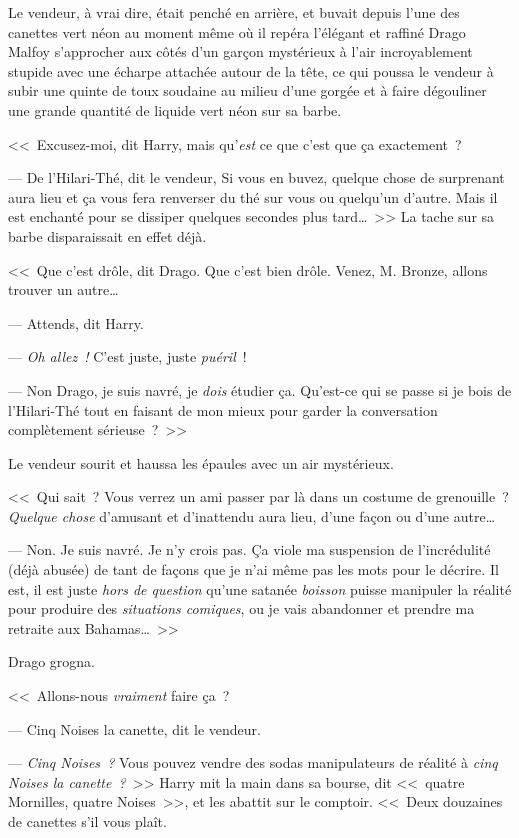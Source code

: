 Le vendeur, à vrai dire, était penché en arrière, et buvait depuis l'une des canettes vert néon au moment même où il repéra l'élégant et raffiné Drago Malfoy s'approcher aux côtés d'un garçon mystérieux à l'air incroyablement stupide avec une écharpe attachée autour de la tête, ce qui poussa le vendeur à subir une quinte de toux soudaine au milieu d'une gorgée et à faire dégouliner une grande quantité de liquide vert néon sur sa barbe.

<<~Excusez-moi, dit Harry, mais qu'\emph{est} ce que c'est que ça exactement~?

--- De l'Hilari-Thé, dit le vendeur, Si vous en buvez, quelque chose de surprenant aura lieu et ça vous fera renverser du thé sur vous ou quelqu'un d'autre. Mais il est enchanté pour se dissiper quelques secondes plus tard…~>> La tache sur sa barbe disparaissait en effet déjà.

<<~Que c'est drôle, dit Drago. Que c'est bien drôle. Venez, M. Bronze, allons trouver un autre…

--- Attends, dit Harry.

--- \emph{Oh allez~!} C'est juste, juste \emph{puéril}~!

--- Non Drago, je suis navré, je \emph{dois} étudier ça. Qu'est-ce qui se passe si je bois de l'Hilari-Thé tout en faisant de mon mieux pour garder la conversation complètement sérieuse~?~>>

Le vendeur sourit et haussa les épaules avec un air mystérieux.

<<~Qui sait~? Vous verrez un ami passer par là dans un costume de grenouille~? \emph{Quelque chose} d'amusant et d'inattendu aura lieu, d'une façon ou d'une autre…

--- Non. Je suis navré. Je n'y crois pas. Ça viole ma suspension de l'incrédulité (déjà abusée) de tant de façons que je n'ai même pas les mots pour le décrire. Il est, il est juste \emph{hors de question} qu'une satanée \emph{boisson} puisse manipuler la réalité pour produire des \emph{situations comiques}, ou je vais abandonner et prendre ma retraite aux Bahamas…~>>

Drago grogna.

<<~Allons-nous \emph{vraiment} faire ça~?

--- Cinq Noises la canette, dit le vendeur.

--- \emph{Cinq Noises~?} Vous pouvez vendre des sodas manipulateurs de réalité à \emph{cinq Noises la canette~?}~>> Harry mit la main dans sa bourse, dit <<~quatre Mornilles, quatre Noises~>>, et les abattit sur le comptoir. <<~Deux douzaines de canettes s'il vous plaît.

